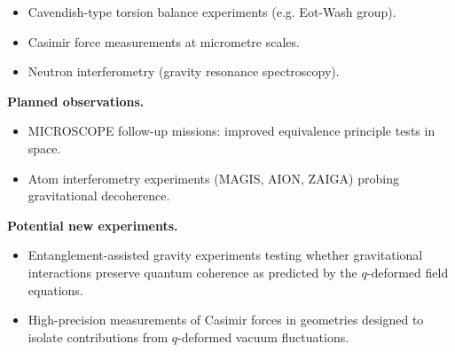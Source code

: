 \begin{itemize}
  \item Cavendish-type torsion balance experiments (e.g. Eot-Wash group).
  \item Casimir force measurements at micrometre scales.
  \item Neutron interferometry (gravity resonance spectroscopy).
\end{itemize}

\textbf{Planned observations.}

\begin{itemize}
  \item MICROSCOPE follow-up missions: improved equivalence principle tests in space.
  \item Atom interferometry experiments (MAGIS, AION, ZAIGA) probing gravitational decoherence.
\end{itemize}

\textbf{Potential new experiments.}

\begin{itemize}
  \item Entanglement-assisted gravity experiments testing whether gravitational interactions preserve quantum coherence as predicted by the $q$-deformed field equations.
  \item High-precision measurements of Casimir forces in geometries designed to isolate contributions from $q$-deformed vacuum fluctuations.
\end{itemize}

